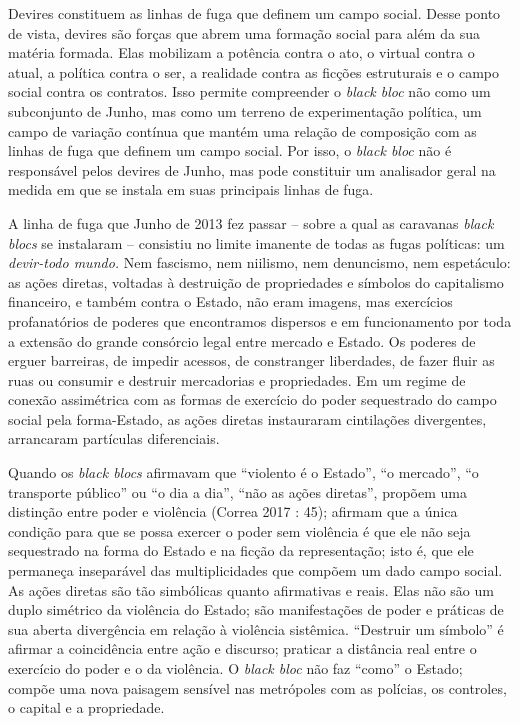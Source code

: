 Devires constituem as linhas de fuga que definem um campo social. Desse
ponto de vista, devires são forças que abrem uma formação social para
além da sua matéria formada. Elas mobilizam a potência contra o ato, o
virtual contra o atual, a política contra o ser, a realidade contra as
ficções estruturais e o campo social contra os contratos. Isso permite
compreender o \emph{black bloc }não como um subconjunto de Junho, mas
como um terreno de experimentação política, um campo de variação
contínua que mantém uma relação de composição com as linhas de fuga que
definem um campo social. Por isso, o \emph{black bloc }não é responsável
pelos devires de Junho, mas pode constituir um analisador geral na
medida em que se instala em suas principais linhas de fuga.

A linha de fuga que Junho de 2013 fez passar -- sobre a qual as
caravanas \emph{black blocs} se instalaram -- consistiu no limite
imanente de todas as fugas políticas: um \emph{devir-todo mundo.} Nem
fascismo, nem niilismo, nem denuncismo, nem espetáculo: as ações
diretas, voltadas à destruição de propriedades e símbolos do capitalismo
financeiro, e também contra o Estado, não eram imagens, mas exercícios
profanatórios de poderes que encontramos dispersos e em funcionamento
por toda a extensão do grande consórcio legal entre mercado e Estado. Os
poderes de erguer barreiras, de impedir acessos, de constranger
liberdades, de fazer fluir as ruas ou consumir e destruir mercadorias e
propriedades. Em um regime de conexão assimétrica com as formas de
exercício do poder sequestrado do campo social pela forma-Estado, as
ações diretas instauraram cintilações divergentes, arrancaram partículas
diferenciais.

Quando os \emph{black blocs} afirmavam que ``violento é o Estado'', ``o
mercado'', ``o transporte público'' ou ``o dia a dia'', ``não as ações
diretas'', propõem uma distinção entre poder e violência (Correa 2017 :
45); afirmam que a única condição para que se possa exercer o poder sem
violência é que ele não seja sequestrado na forma do Estado e na ficção
da representação; isto é, que ele permaneça inseparável das
multiplicidades que compõem um dado campo social. As ações diretas são
tão simbólicas quanto afirmativas e reais. Elas não são um duplo
simétrico da violência do Estado; são manifestações de poder e práticas
de sua aberta divergência em relação à violência sistêmica. ``Destruir
um símbolo'' é afirmar a coincidência entre ação e discurso; praticar a
distância real entre o exercício do poder e o da violência. O
\emph{black bloc} não faz ``como'' o Estado; compõe uma nova paisagem
sensível nas metrópoles com as polícias, os controles, o capital e a
propriedade.

